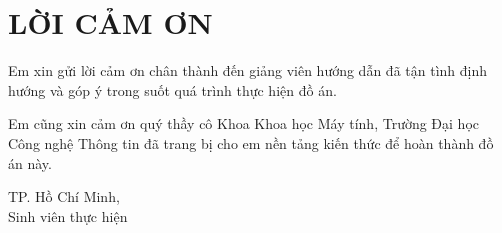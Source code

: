 \chapter*{LỜI CẢM ƠN}
\thispagestyle{empty}

Em xin gửi lời cảm ơn chân thành đến giảng viên hướng dẫn \advisor{} đã tận tình
định hướng và góp ý trong suốt quá trình thực hiện đồ án.

Em cũng xin cảm ơn quý thầy cô Khoa Khoa học Máy tính, Trường Đại học Công nghệ
Thông tin đã trang bị cho em nền tảng kiến thức để hoàn thành đồ án này.

\vspace{1cm}
\begin{flushright}
TP. Hồ Chí Minh, \thesisyear\\
Sinh viên thực hiện\\[1cm]
\authorname
\end{flushright}
